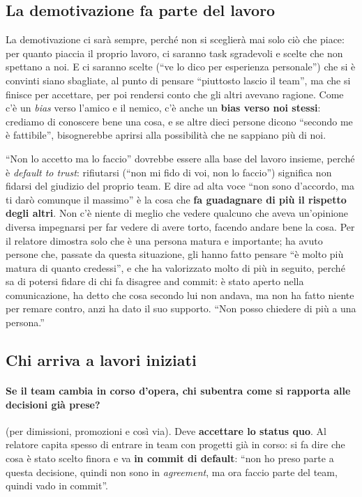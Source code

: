 \subsection{La demotivazione fa parte del lavoro}

La demotivazione ci sarà sempre, perché non si sceglierà mai solo ciò che piace: per quanto
piaccia il proprio lavoro, ci saranno task sgradevoli e scelte che non spettano a noi. E
ci saranno scelte (``ve lo dico per esperienza personale'') che si è convinti siano
sbagliate, al punto di pensare ``piuttosto lascio il team'', ma che si finisce per accettare,
per poi rendersi conto che gli altri avevano ragione. Come c'è un \emph{bias} verso l'amico e
il nemico, c'è anche un \textbf{bias verso noi stessi}: crediamo di conoscere bene una cosa, e
se altre dieci persone dicono ``secondo me è fattibile'', bisognerebbe aprirsi alla
possibilità che ne sappiano più di noi.

``Non lo accetto ma lo faccio'' dovrebbe essere alla base del lavoro insieme, perché è
\emph{default to trust}: rifiutarsi (``non mi fido di voi, non lo faccio'') significa non
fidarsi del giudizio del proprio team. E dire ad alta voce ``non sono d'accordo, ma ti darò
comunque il massimo'' è la cosa che \textbf{fa guadagnare di più il rispetto degli altri}.
Non c'è niente di meglio che vedere qualcuno che aveva un'opinione diversa impegnarsi per
far vedere di avere torto, facendo andare bene la cosa. Per il relatore dimostra solo che è
una persona matura e importante; ha avuto persone che, passate da questa situazione, gli
hanno fatto pensare ``è molto più matura di quanto credessi'', e che ha valorizzato molto di
più in seguito, perché sa di potersi fidare di chi fa disagree and commit: è stato aperto
nella comunicazione, ha detto che cosa secondo lui non andava, ma non ha fatto niente per
remare contro, anzi ha dato il suo supporto. ``Non posso chiedere di più a una persona.''

\subsection{Chi arriva a lavori iniziati}

\paragraph{Se il team cambia in corso d'opera, chi subentra come si rapporta alle decisioni
già prese?} (per dimissioni, promozioni e così via). Deve \textbf{accettare lo status quo}. Al
relatore capita spesso di entrare in team con progetti già in corso: si fa dire che cosa è
stato scelto finora e va \textbf{in commit di default}: ``non ho preso parte a questa decisione,
quindi non sono in \emph{agreement}, ma ora faccio parte del team, quindi vado in commit''.

